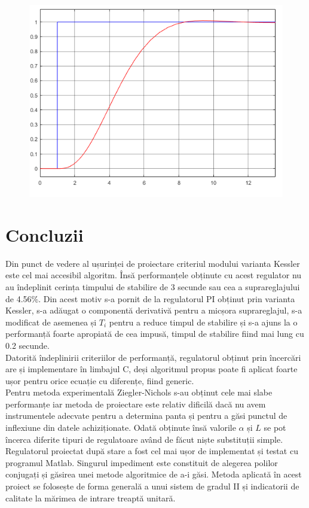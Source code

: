\documentclass[11pt]{article}
\begin{document}
\begin{figure}[H]
	\centering
	\includegraphics[width=.55\linewidth]{rasp_stare.png}
	\label{fig:test2}
\end{figure}


\section{Concluzii}
Din punct de vedere al ușurinței de proiectare criteriul modului varianta Kessler este cel mai accesibil algoritm. Însă performanțele obținute cu acest regulator nu au îndeplinit cerința timpului de stabilire de 3 secunde sau cea a suprareglajului de 4.56\%. Din acest motiv s-a pornit de la regulatorul PI obținut prin varianta Kessler, s-a adăugat o componentă derivativă pentru a micșora suprareglajul, s-a modificat de asemenea și $T_i$ pentru a reduce timpul de stabilire și s-a ajuns la o performanță foarte apropiată de cea impusă, timpul de stabilire fiind mai lung cu 0.2 secunde.\\
Datorită îndeplinirii criteriilor de performanță, regulatorul obținut prin încercări are și implementare în limbajul C, deși algoritmul propus poate fi aplicat foarte ușor pentru orice ecuație cu diferențe, fiind generic.\\
Pentru metoda experimentală Ziegler-Nichols s-au obținut cele mai slabe performanțe iar metoda de proiectare este relativ dificilă dacă nu avem instrumentele adecvate pentru a determina panta și  pentru a găsi punctul de inflexiune din datele achiziționate. Odată obținute însă valorile $\alpha$ și $L$ se pot încerca diferite tipuri de regulatoare având de făcut niște substituții simple.\\
Regulatorul proiectat după stare a fost cel mai ușor de implementat și testat cu programul Matlab. Singurul impediment este constituit de alegerea polilor conjugați și găsirea unei metode algoritmice de a-i găsi. Metoda aplicată în acest proiect se folosește de forma generală a unui sistem de gradul II și indicatorii de calitate la mărimea de intrare treaptă unitară.  
\newpage

\nocite{*}


\end{document}

